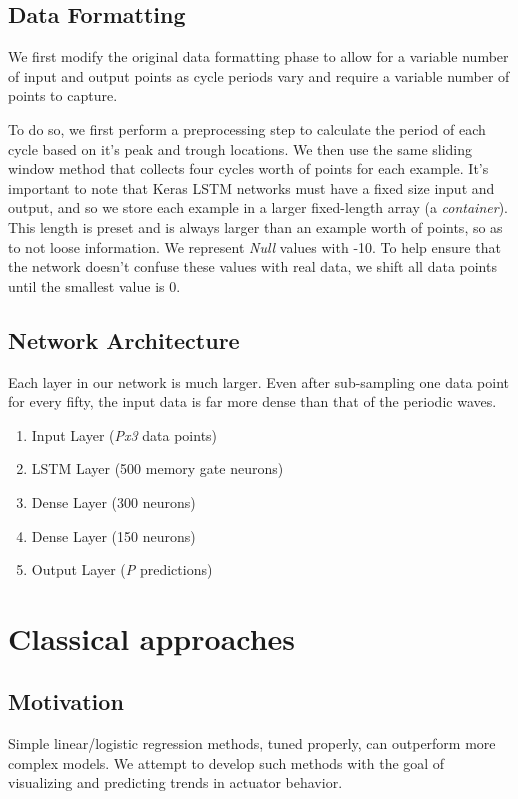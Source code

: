 \documentclass[letterpaper, 10 pt, conference]{ieeeconf}  %
\begin{document}
\subsection{Data Formatting}
We first modify the original data formatting phase to allow for a variable number of input and output points as cycle periods vary and require a variable number of points to capture.

To do so, we first perform a  preprocessing step to calculate the period of each cycle based on it's peak and trough locations. We then use the same sliding window method that collects four cycles worth of points for each example. It's important to note that Keras LSTM networks must have a fixed size input and output, and so we store each example in a larger fixed-length array (a \textit{container}). This length is preset and is always larger than an example worth of points, so as to not loose information. We represent \textit{Null} values with -10. To help ensure that the network doesn't confuse these values with real data, we shift all data points until the smallest value is 0.

\subsection{Network Architecture}

Each layer in our network is much larger. Even after sub-sampling one data point for every fifty, the input data is far more dense than that of the periodic waves.

\begin{enumerate}
\item Input Layer (\textit{Px3} data points)
\item LSTM Layer  (500 memory gate neurons)
\item Dense Layer (300 neurons)
\item Dense Layer (150 neurons)
\item Output Layer (\textit{P} predictions)
\end{enumerate}
\vspace{8pt}
\section{Classical approaches}
\subsection{Motivation}
Simple linear/logistic regression methods, tuned properly, can outperform more complex models. We attempt to develop such methods with the goal of visualizing and predicting trends in actuator behavior.
\end{document}
